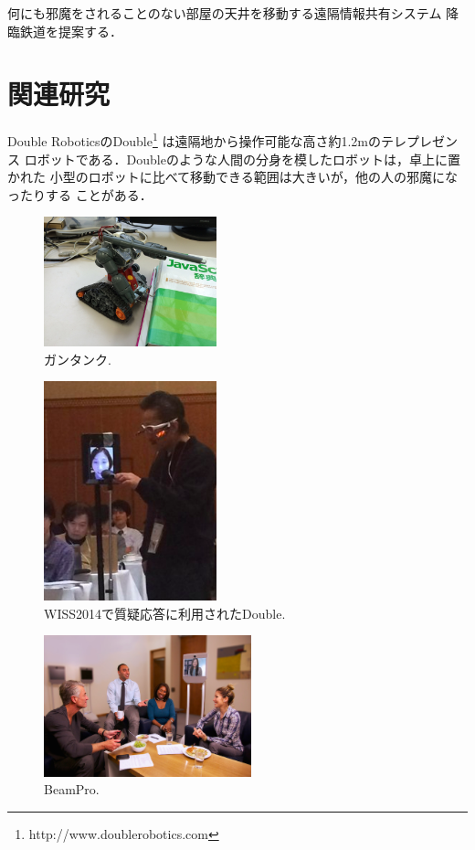 \documentclass[submit,techreq]{ipsj}
\begin{document}
何にも邪魔をされることのない部屋の天井を移動する遠隔情報共有システム
降臨鉄道を提案する．

\section{関連研究}

Double RoboticsのDouble\footnote{
  \textsf{http://www.doublerobotics.com}
}
は遠隔地から操作可能な高さ約1.2mのテレプレゼンス
ロボットである．Doubleのような人間の分身を模したロボットは，卓上に置かれた
小型のロボットに比べて移動できる範囲は大きいが，他の人の邪魔になったりする
ことがある．

\begin{figure}[H]
\centerline{\includegraphics[width=50mm]{figures/1e8781bb2a5b28c8e06906d226c7505a.png}}
\caption{ガンタンク.}
\label{Guntank}
\end{figure}



\begin{figure}[H]
\centerline{\includegraphics[width=50mm]{figures/b74f4564d4b38d12e48fcf80fef96def.png}}
\caption{WISS2014で質疑応答に利用されたDouble.}
\label{double}
\end{figure}

\begin{figure}[H]
\centerline{\includegraphics[width=60mm]{figures/2c092d5d4467d5b2572acef0c95b22ff.png}}
\caption{BeamPro.}
\label{beampro}
\end{figure}
\end{document}
